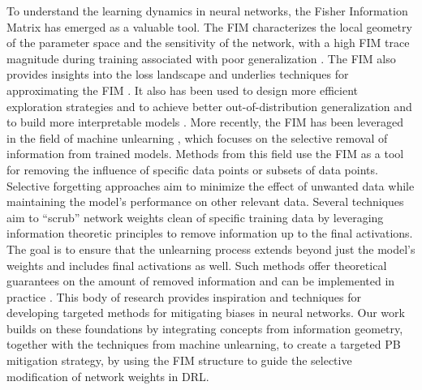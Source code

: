 To understand the learning dynamics in neural networks, the Fisher Information Matrix has emerged as a valuable tool. The FIM characterizes the local geometry of the parameter space and the sensitivity of the network, with a high FIM trace magnitude during training associated with poor generalization \cite{jastrzebski2021catastrophic}. The FIM also provides insights into the loss landscape \cite{hochreiter1997flat} and underlies techniques for approximating the FIM \cite{martens2015optimizing, george2018fast}. It also has been used to design more efficient exploration strategies \cite{kakade2001natural} and to achieve better out-of-distribution generalization \cite{pascanu2013revisiting, rame2022fishr} and to build more interpretable models \cite{luber2023structural}. More recently, the FIM has been leveraged in the field of machine unlearning \cite{Xu2023MachineUA}, which focuses on the selective removal of information from trained models. Methods from this field use the FIM as a tool for removing the influence of specific data points or subsets of data points. Selective forgetting approaches aim to minimize the effect of unwanted data while maintaining the model's performance on other relevant data. Several techniques aim to “scrub” network weights clean of specific training data \cite{golatkar2020forgetting, golatkar2020eternal} by leveraging information theoretic principles to remove information up to the final activations. The goal is to ensure that the unlearning process extends beyond just the model's weights and includes final activations as well. Such methods offer theoretical guarantees on the amount of removed information and can be implemented in practice \cite{ramkumar2024effectiveness}. This body of research provides inspiration and techniques for developing targeted methods for mitigating biases in neural networks. Our work builds on these foundations by integrating concepts from information geometry, together with the techniques from machine unlearning, to create a targeted PB mitigation strategy, by using the FIM structure to guide the selective modification of network weights in DRL.